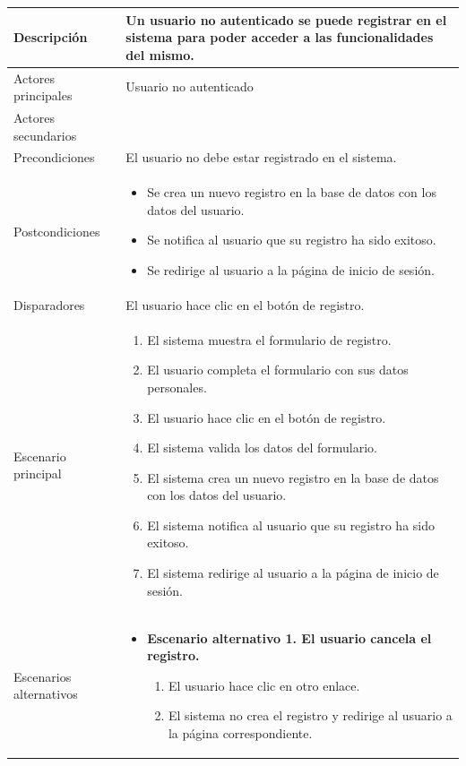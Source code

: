 \begin{longtable}{
    >{\columncolor{lightgreen!20}}p{4cm}
    p{12cm}
    }
    \midrule
    Descripción & Un usuario no autenticado se puede registrar en el sistema para poder acceder a las funcionalidades del mismo. \\
    \midrule
    Actores principales & Usuario no autenticado \\
    \midrule
    Actores secundarios &  \\
    \midrule
    Precondiciones & El usuario no debe estar registrado en el sistema. \\
    \midrule
    Postcondiciones & \begin{itemize}[nosep,leftmargin=*]
      \item Se crea un nuevo registro en la base de datos con los datos del usuario.
      \item Se notifica al usuario que su registro ha sido exitoso.
      \item Se redirige al usuario a la página de inicio de sesión.
    \end{itemize} \\
    \midrule
    Disparadores & El usuario hace clic en el botón de registro. \\
    \midrule
    Escenario principal & \begin{enumerate}[nosep,leftmargin=*]
      \item El sistema muestra el formulario de registro.
      \item El usuario completa el formulario con sus datos personales.
      \item El usuario hace clic en el botón de registro.
      \item El sistema valida los datos del formulario.
      \item El sistema crea un nuevo registro en la base de datos con los datos del usuario.
      \item El sistema notifica al usuario que su registro ha sido exitoso.
      \item El sistema redirige al usuario a la página de inicio de sesión.
    \end{enumerate} \\
    \midrule
    Escenarios alternativos & 
    \begin{itemize}[nosep,leftmargin=*]
      \item \textbf{Escenario alternativo 1. El usuario cancela el registro.}
      \begin{enumerate}[nosep,leftmargin=*]
          \item El usuario hace clic en otro enlace.
          \item El sistema no crea el registro y redirige al usuario a la página correspondiente.

\end{enumerate}
\end{itemize}
\end{longtable}
